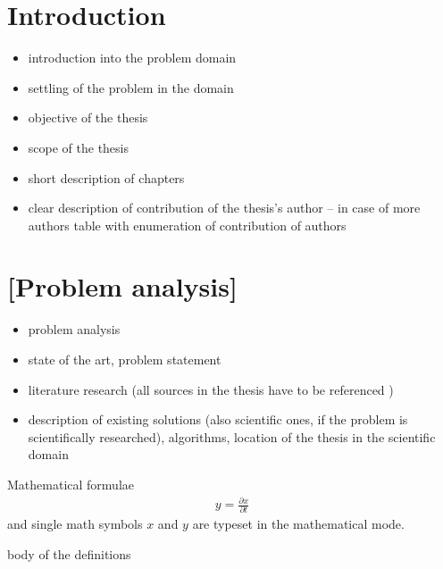 \documentclass[a4paper,twoside,12pt]{book}
\newtheorem{Definition}{Definition}
\newtheorem{Example}{Example}
\newtheorem{Theorem}{Theorem}
\newcounter{pagesWithoutNumbers}
\begin{document}
\setcounter{pagesWithoutNumbers}{\value{page}}
\mainmatter
\pagestyle{empty}

\cleardoublepage

\pagestyle{PageNumbersChapterTitles}


\chapter{Introduction}

\begin{itemize}
\item introduction into the problem domain
\item settling of the problem in the domain
\item objective of the thesis 
\item scope of the thesis
\item short description of chapters
\item clear description of contribution of the thesis's author – in case of more authors table with enumeration of contribution of authors
\end{itemize}


\chapter{[Problem analysis]}

\begin{itemize}
\item  problem analysis
\item state of the art, problem statement
\item  literature research (all sources in the thesis have to be referenced \cite{bib:article,bib:book,bib:conference,bib:internet})
\item description of existing solutions (also scientific ones, if the problem is scientifically researched), algorithms,  location of the thesis in the scientific domain
\end{itemize}



Mathematical formulae  
\begin{align}
y = \frac{\partial x}{\partial t}
\end{align}
and single math symbols $x$ and $y$ are typeset in the mathematical mode.


body of the definitions
%
%
\end{document}
